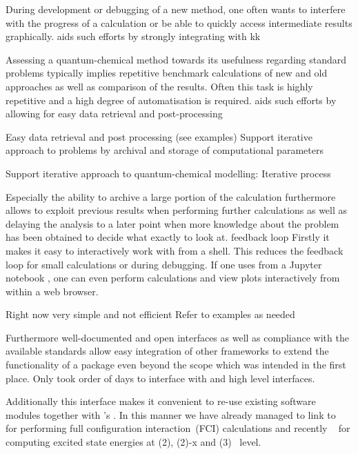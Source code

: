 During development or debugging of a new method,
one often wants to interfere with the progress of a calculation
or be able to quickly access intermediate results graphically.
\molsturm aids such efforts by strongly integrating
with kk


Assessing a quantum-chemical method towards its usefulness
regarding standard problems typically implies repetitive
benchmark calculations of new and old approaches
as well as comparison of the results.
Often this task is highly repetitive and
a high degree of automatisation is required.
\molsturm aids such efforts by allowing for easy
data retrieval and post-processing 

Easy data retrieval and post processing (see examples)
Support iterative approach to problems by archival
and storage of computational parameters

Support iterative approach to quantum-chemical modelling:
Iterative process

Especially the ability to archive a large portion of the calculation
furthermore allows to exploit previous results when performing
further calculations as well as delaying the analysis
to a later point when \eg more knowledge about the
problem has been obtained to decide what exactly to look at.
%
feedback loop
Firstly it makes it easy to interactively work with \molsturm
from a shell. This reduces the feedback loop for small calculations
or during debugging.  If one uses \molsturm from a Jupyter notebook \cite{Jupyter},
one can even perform calculations and view plots interactively from within a web browser.

Right now very simple and not efficient
Refer to examples as needed



Furthermore well-documented and open interfaces
as well as compliance with the available standards
allow easy integration of other frameworks to extend
the functionality of a package even beyond the scope
which was intended in the first place.
Only took order of days to interface with \pyscf and \adcman
high level interfaces.


Additionally this interface makes it
convenient to re-use existing software modules
together with \molsturm's \SCF.
In this manner we have already managed to link \molsturm to \pyscf~\cite{Sun2017}
for performing full configuration interaction~(FCI) calculations
and recently \adcman~\cite{Wormit2014}
for computing excited state energies at \ADC(2),
\ADC(2)-x and \ADC(3)~\cite{Schirmer1982,Trofimov1999} level.


